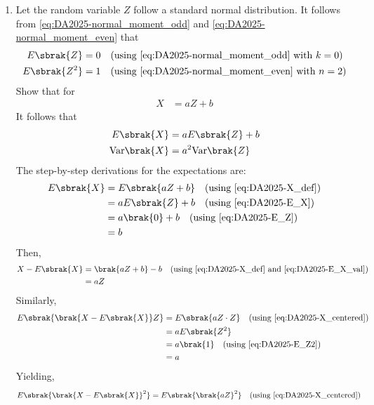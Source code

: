 \begin{enumerate}[label=\thesubsection.\arabic*, ref=\thesubsection.\theenumi]
\item Let the random variable $Z$ follow a standard normal distribution.
It follows from \eqref{eq:DA2025-normal_moment_odd} and \eqref{eq:DA2025-normal_moment_even} that
\begin{align}
	E\sbrak{Z} &= 0 \quad \text{(using \eqref{eq:DA2025-normal_moment_odd} with $k=0$)} \label{eq:DA2025-E_Z}
	\\
	E\sbrak{Z^2} &= 1 \quad \text{(using \eqref{eq:DA2025-normal_moment_even} with $n=2$)} \label{eq:DA2025-E_Z2}
\end{align}
Show that for
\begin{align}
	X &= aZ + b \label{eq:DA2025-X_def}
\end{align}
It follows that
\begin{align}
	E\sbrak{X} &= aE\sbrak{Z} + b \label{eq:DA2025-E_X}
	\\
	\text{Var}\brak{X} &= a^2\text{Var}\brak{Z} \label{eq:DA2025-affine_rv}
\end{align}
\solution
The step-by-step derivations for the expectations are:
\begin{align}
	E\sbrak{X} &= E\sbrak{aZ + b} \quad \text{(using \eqref{eq:DA2025-X_def})}
	\\
	&= aE\sbrak{Z} + b \quad \text{(using \eqref{eq:DA2025-E_X})}
	\\
	&= a\brak{0} + b \quad \text{(using \eqref{eq:DA2025-E_Z})}
	\\
	&= b \label{eq:DA2025-E_X_val}
\end{align}
Then,
\begin{align}
	X - E\sbrak{X} &= \brak{aZ + b} - b \quad \text{(using \eqref{eq:DA2025-X_def} and \eqref{eq:DA2025-E_X_val})}
	\\
	&= aZ \label{eq:DA2025-X_centered}
\end{align}
Similarly,
\begin{align}
	E\sbrak{\brak{X - E\sbrak{X}}Z} &= E\sbrak{aZ \cdot Z} \quad \text{(using \eqref{eq:DA2025-X_centered})}
	\\
	&= aE\sbrak{Z^2}
	\\
	&= a\brak{1} \quad \text{(using \eqref{eq:DA2025-E_Z2})}
	\\
	&= a
\end{align}
Yielding,
\begin{align}
	E\sbrak{\brak{X - E\sbrak{X}}^2} &= E\sbrak{\brak{aZ}^2} \quad \text{(using \eqref{eq:DA2025-X_centered})}

\end{align}
\end{enumerate}
